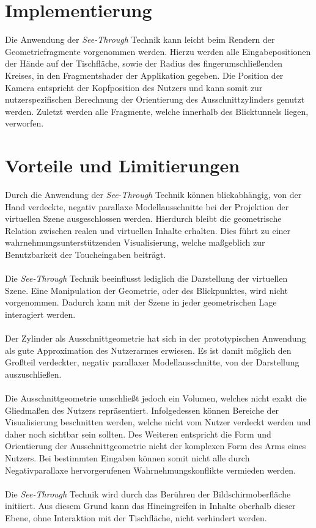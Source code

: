 \section{Implementierung}
\label{sec:implementierung_freischneiden}

Die Anwendung der \emph{See-Through} Technik kann leicht beim Rendern der Geometriefragmente vorgenommen werden. Hierzu werden alle Eingabepositionen der Hände auf der Tischfläche, sowie der Radius des fingerumschließenden Kreises, in den Fragmentshader der Applikation gegeben. Die Position der Kamera entspricht der Kopfposition des Nutzers und kann somit zur nutzerspezifischen Berechnung der Orientierung des Ausschnittzylinders genutzt werden. Zuletzt werden alle Fragmente, welche innerhalb des Blicktunnels liegen, verworfen.


\section{Vorteile und Limitierungen}
\label{sec:vorteile_und_limitierungen_freischneiden}

Durch die Anwendung der \emph{See-Through} Technik können blickabhängig, von der Hand verdeckte, negativ parallaxe Modellausschnitte bei der Projektion der virtuellen Szene ausgeschlossen werden. Hierdurch bleibt die geometrische Relation zwischen realen und virtuellen Inhalte erhalten. Dies führt zu einer wahrnehmungsunterstützenden Visualisierung, welche maßgeblich zur Benutzbarkeit der Toucheingaben beiträgt.
\\\\
Die \emph{See-Through} Technik beeinflusst lediglich die Darstellung der virtuellen Szene. Eine Manipulation der Geometrie, oder des Blickpunktes, wird nicht vorgenommen. Dadurch kann mit der Szene in jeder geometrischen Lage interagiert werden.
\\\\
Der Zylinder als Ausschnittgeometrie hat sich in der prototypischen Anwendung als gute Approximation des Nutzerarmes erwiesen. Es ist damit möglich den Großteil verdeckter, negativ parallaxer Modellausschnitte, von der Darstellung auszuschließen.
\\\\
Die Ausschnittgeometrie umschließt jedoch ein Volumen, welches nicht exakt die Gliedmaßen des Nutzers repräsentiert. Infolgedessen können Bereiche der Visualisierung beschnitten werden, welche nicht vom Nutzer verdeckt werden und daher noch sichtbar sein sollten. Des Weiteren entspricht die Form und Orientierung der Ausschnittgeometrie nicht der komplexen Form des Arms eines Nutzers. Bei bestimmten Eingaben können somit nicht alle durch Negativparallaxe hervorgerufenen Wahrnehmungskonflikte vermieden werden.
\\\\
Die \emph{See-Through} Technik wird durch das Berühren der Bildschirmoberfläche initiiert. Aus diesem Grund kann das Hineingreifen in Inhalte oberhalb dieser Ebene, ohne Interaktion mit der Tischfläche, nicht verhindert werden.